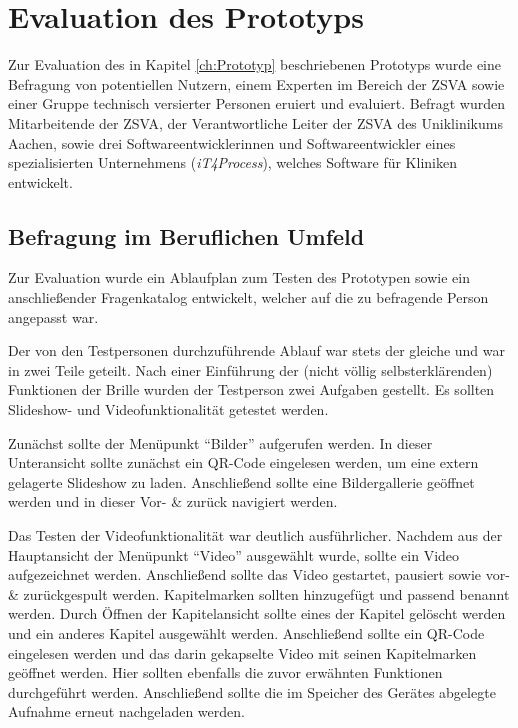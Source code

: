 %
%
%
%
%
%
\chapter{Evaluation des Prototyps}
\label{ch:Evaluation_des_Prototyps}
Zur Evaluation des in Kapitel \ref{ch:Prototyp} beschriebenen Prototyps wurde eine Befragung von potentiellen Nutzern, einem Experten im Bereich der ZSVA sowie einer Gruppe technisch versierter Personen eruiert und evaluiert. Befragt wurden
Mitarbeitende der ZSVA, 
der Verantwortliche Leiter der ZSVA des Uniklinikums Aachen, 
sowie drei Softwareentwicklerinnen und Softwareentwickler eines spezialisierten Unternehmens (\emph{iT4Process}), welches Software für Kliniken entwickelt.
%
%
%
%
%
%
%
%
\section{Befragung im Beruflichen Umfeld}
\label{sec:Befragung_im_Beruflichen_Umfeld}
Zur Evaluation wurde ein Ablaufplan zum Testen des Prototypen sowie ein anschließender Fragenkatalog entwickelt, welcher auf die zu befragende Person angepasst war. 

Der von den Testpersonen durchzuführende Ablauf war stets der gleiche und war in zwei Teile geteilt. Nach einer Einführung der (nicht völlig selbsterklärenden) Funktionen der Brille wurden der Testperson zwei Aufgaben gestellt. Es sollten Slideshow- und Videofunktionalität getestet werden. 

Zunächst sollte der Menüpunkt \enquote{Bilder} aufgerufen werden. In dieser Unteransicht sollte zunächst ein QR-Code eingelesen werden, um eine extern gelagerte Slideshow zu laden. Anschließend sollte eine Bildergallerie geöffnet werden und in dieser Vor- \& zurück navigiert werden.

Das Testen der Videofunktionalität war deutlich ausführlicher. Nachdem aus der Hauptansicht der Menüpunkt \enquote{Video} ausgewählt wurde, sollte ein Video aufgezeichnet werden. Anschließend sollte das Video gestartet, pausiert sowie vor- \& zurückgespult werden. Kapitelmarken sollten hinzugefügt und passend benannt werden. Durch Öffnen der Kapitelansicht sollte eines der Kapitel gelöscht werden und ein anderes Kapitel ausgewählt werden. Anschließend sollte ein QR-Code eingelesen werden und das darin gekapselte Video mit seinen Kapitelmarken geöffnet werden. Hier sollten ebenfalls die zuvor erwähnten Funktionen durchgeführt werden. Anschließend sollte die im Speicher des Gerätes abgelegte Aufnahme erneut nachgeladen werden.

